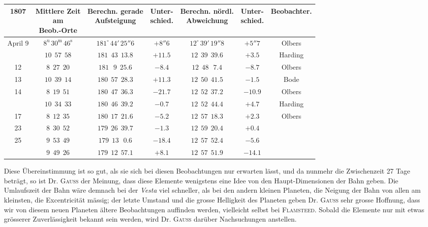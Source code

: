 \begin{center}\begingroup
\fontsize{8}{10}\selectfont
\setlength{\tabcolsep}{2.5pt}\renewcommand{\arraystretch}{1.15}
\begin{tabular}{c|c|c|c|c|c|c}
1807 & \shortstack{Mittlere Zeit\\am\\Beob.-Orte} & \shortstack{Berechn. gerade\\Aufsteigung\\\VestaRATwoNinetyTwo{}} & \shortstack{Unter-\\schied.} & \shortstack{Berechn. nördl.\\Abweichung\\\VestaDecTwoNinetyTwo{}} & \shortstack{Unter-\\schied.} & Beobachter. \\ \hline
April 9 & $8^{\text{u}}\,30^{\text{m}}\,46^{\text{s}}$ & $181^\circ\,44'\,25''6$ & $+8''6$ & $12^\circ\,39'\,19''8$ & $+5''7$ & Olbers \\
   & $10\ \ 57\ \ 58$ & $181\ \ 43\ \ 13.8$ & $+11.5$ & $12\ \ 39\ \ 39.6$ & $+3.5$ & Harding \\
12 & $8\ \ 27\ \ 20$ & $181\ \ \ 9\ \ 25.6$ & $-8.4$ & $12\ \ 48\ \ \ 7.4$ & $-8.7$ & Olbers \\
13 & $10\ \ 39\ \ 14$ & $180\ \ 57\ \ 28.3$ & $+11.3$ & $12\ \ 50\ \ 41.5$ & $-1.5$ & Bode \\
14 & $8\ \ 19\ \ 51$ & $180\ \ 47\ \ 36.3$ & $-21.7$ & $12\ \ 52\ \ 37.2$ & $-10.9$ & Olbers \\
   & $10\ \ 34\ \ 33$ & $180\ \ 46\ \ 39.2$ & $-0.7$ & $12\ \ 52\ \ 44.4$ & $+4.7$ & Harding \\
17 & $8\ \ 12\ \ 35$ & $180\ \ 17\ \ 21.6$ & $-5.2$ & $12\ \ 57\ \ 18.3$ & $+2.3$ & Olbers \\
23 & $8\ \ 30\ \ 52$ & $179\ \ 26\ \ 39.7$ & $-1.3$ & $12\ \ 59\ \ 20.4$ & $+0.4$ & \\
25 & $9\ \ 53\ \ 49$ & $179\ \ 13\ \ \ 0.6$ & $-18.4$ & $12\ \ 57\ \ 52.4$ & $-5.6$ & \\
   & $9\ \ 49\ \ 26$ & $179\ \ 12\ \ 57.1$ & $+8.1$ & $12\ \ 57\ \ 51.9$ & $-14.1$ &
\end{tabular}\endgroup\end{center}

\par\indent Diese Übereinstimmung ist so gut, als sie sich bei diesen Beobachtungen nur erwarten lässt, und da nunmehr die Zwischenzeit 27 Tage beträgt, so ist Dr. \textsc{Gauss} der Meinung, dass diese Elemente wenigstens eine Idee von den Haupt-Dimensionen der Bahn geben. Die Umlaufszeit der Bahn wäre demnach bei der \emph{Vesta} viel schneller, als bei den andern kleinen Planeten, die Neigung der Bahn von allen am kleinsten, die Excentricität mässig; der letzte Umstand und die grosse Helligkeit des Planeten geben Dr. \textsc{Gauss} sehr grosse Hoffnung, dass wir von diesem neuen Planeten ältere Beobachtungen auffinden werden, vielleicht selbst bei \textsc{Flamsteed}. Sobald die Elemente nur mit etwas grösserer Zuverlässigkeit bekannt sein werden, wird Dr. \textsc{Gauss} darüber Nachsuchungen anstellen.

